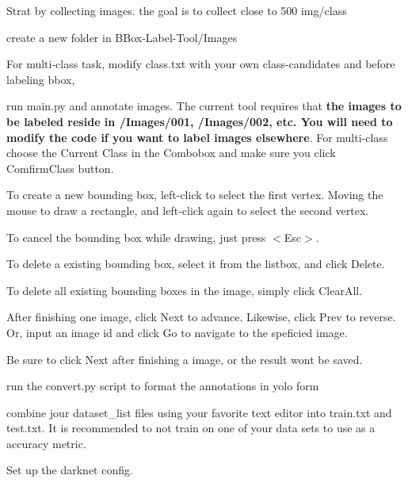 \begin{DoxyEnumerate}
\item Strat by collecting images. the goal is to collect close to 500 img/class
\item create a new folder in B\+Box-\/\+Label-\/\+Tool/\+Images
\item For multi-\/class task, modify \textquotesingle{}class.\+txt\textquotesingle{} with your own class-\/candidates and before labeling bbox,
\item run main.\+py and annotate images. The current tool requires that {\bfseries{the images to be labeled reside in /\+Images/001, /\+Images/002, etc. You will need to modify the code if you want to label images elsewhere}}. For multi-\/class choose the \textquotesingle{}Current Class\textquotesingle{} in the Combobox and make sure you click \textquotesingle{}Comfirm\+Class\textquotesingle{} button.
\item To create a new bounding box, left-\/click to select the first vertex. Moving the mouse to draw a rectangle, and left-\/click again to select the second vertex.
\begin{DoxyItemize}
\item To cancel the bounding box while drawing, just press {\ttfamily $<$Esc$>$}.
\item To delete a existing bounding box, select it from the listbox, and click {\ttfamily Delete}.
\item To delete all existing bounding boxes in the image, simply click {\ttfamily Clear\+All}.
\end{DoxyItemize}
\item After finishing one image, click {\ttfamily Next} to advance. Likewise, click {\ttfamily Prev} to reverse. Or, input an image id and click {\ttfamily Go} to navigate to the speficied image.
\begin{DoxyItemize}
\item Be sure to click {\ttfamily Next} after finishing a image, or the result won\textquotesingle{}t be saved.
\end{DoxyItemize}
\item run the convert.\+py script to format the annotations in yolo form
\item combine jour dataset\+\_\+list files using your favorite text editor into train.\+txt and test.\+txt. It is recommended to not train on one of your data sets to use as a accuracy metric.
\item Set up the darknet config.
\end{DoxyEnumerate}
